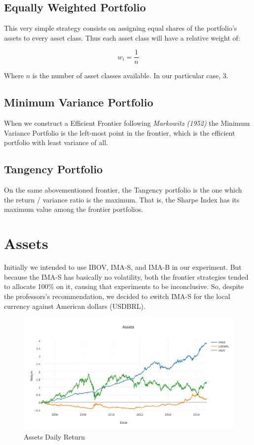 \documentclass[paper=a4, fontsize=11pt]{scrartcl} %
\numberwithin{equation}{section} %
\numberwithin{figure}{section} %
\numberwithin{table}{section} %
\begin{document}
\subsection{Equally Weighted Portfolio}

This very simple strategy consists on assigning equal shares of the portfolio's assets to every asset class.
Thus each asset class will have a relative weight of:

$$w_i = \frac{1}{n}$$

Where $n$ is the number of asset classes available. In our particular case, 3.

\subsection{Minimum Variance Portfolio}

When we construct a Efficient Frontier following \textit{Markowitz (1952)} the Minimum Variance Portfolio is the left-most point in the frontier, which is the efficient portfolio with least variance of all.

\subsection{Tangency Portfolio}

On the same abovementioned frontier, the Tangency portfolio is the one which the return / variance ratio is the maximum. That is, the Sharpe Index has its maximum value among the frontier portfolios.


\section{Assets}

Initially we intended to use IBOV, IMA-S, and IMA-B in our experiment. But because the IMA-S has basically no volatility, both the frontier strategies tended to allocate 100\% on it, causing that experiments to be inconclusive. So, despite the professors's recommendation,  we decided to switch IMA-S for the local currency against American dollars (USDBRL).

\begin{figure}[H]
  \includegraphics[width=\linewidth]{Assets.png}
  \caption{Assets Daily Return}
  \label{fig:Assets}
\end{figure}
\end{document}
